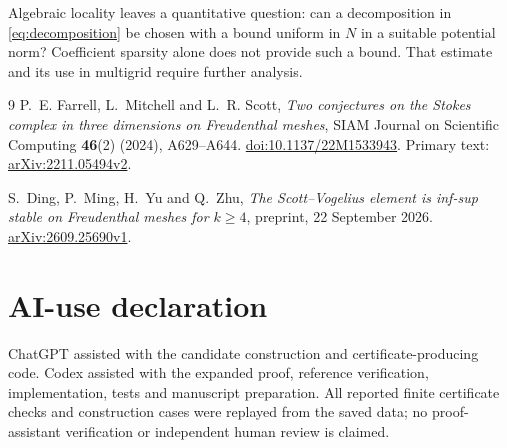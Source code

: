 \documentclass[11pt]{article}
\theoremstyle{remark}
\begin{document}
Algebraic locality leaves a quantitative question: can a decomposition
in \eqref{eq:decomposition} be chosen with a bound uniform in $N$ in
a suitable potential norm? Coefficient sparsity alone does not provide
such a bound. That estimate and its use in multigrid require further analysis.

\begin{thebibliography}{9}
P.~E. Farrell, L.~Mitchell and L.~R. Scott,
\emph{Two conjectures on the Stokes complex in three dimensions on
Freudenthal meshes}, SIAM Journal on Scientific Computing
\textbf{46}(2) (2024), A629--A644.
\href{https://doi.org/10.1137/22M1533943}{doi:10.1137/22M1533943}.
Primary text: \href{https://arxiv.org/abs/2211.05494v2}{arXiv:2211.05494v2}.

S.~Ding, P.~Ming, H.~Yu and Q.~Zhu,
\emph{The Scott--Vogelius element is inf-sup stable on Freudenthal meshes
for $k\ge4$}, preprint, 22 September 2026.
\href{https://arxiv.org/abs/2609.25690v1}{arXiv:2609.25690v1}.
\end{thebibliography}

\section*{AI-use declaration}
ChatGPT assisted with the candidate construction and certificate-producing
code. Codex assisted with the expanded proof, reference verification,
implementation, tests and manuscript preparation. All reported finite
certificate checks and construction cases were replayed from the saved
data; no proof-assistant verification or independent human review is claimed.
\end{document}
